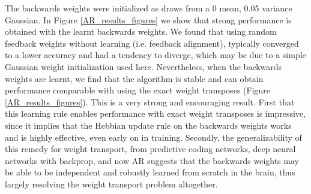 The backwards weights were initialized as draws from a 0 mean, 0.05 variance Gaussian. In Figure \ref{AR_results_figures} we show that strong performance is obtained with the learnt backwards weights. We found that using random feedback weights without learning (i.e. feedback alignment), typically converged to a lower accuracy and had a tendency to diverge, which may be due to a simple Gaussian weight initialization used here. Nevertheless, when the backwards weights are learnt, we find that the algorithm is stable and can obtain performance comparable with using the exact weight transposes (Figure \ref{AR_results_figures}).  This is a very strong and encouraging result. First that this learning rule enables performance with exact weight transposes is impressive, since it implies that the Hebbian update rule on the backwards weights works and is highly effective, even early on in training. Secondly, the generalizability of this remedy for weight transport, from predictive coding networks, deep neural networks \citep{amit2019deep,akrout2019deep} with backprop, and now AR suggests that the backwards weights may be able to be independent and robustly learned from scratch in the brain, thus largely resolving the weight transport problem altogether.

